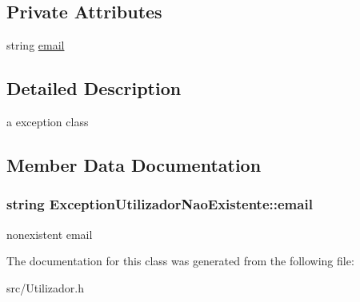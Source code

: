 \subsection*{Private Attributes}
\begin{DoxyCompactItemize}
\item 
string \hyperlink{class_exception_utilizador_nao_existente_a4e29231dbb3f22d7eff5abe95de52927}{email}
\end{DoxyCompactItemize}


\subsection{Detailed Description}
a exception class 

\subsection{Member Data Documentation}
\hypertarget{class_exception_utilizador_nao_existente_a4e29231dbb3f22d7eff5abe95de52927}{}
\subsubsection[{email}]{\setlength{\rightskip}{0pt plus 5cm}string Exception\+Utilizador\+Nao\+Existente\+::email\hspace{0.3cm}{\ttfamily [private]}}\label{class_exception_utilizador_nao_existente_a4e29231dbb3f22d7eff5abe95de52927}
nonexistent email 

The documentation for this class was generated from the following file\+:\begin{DoxyCompactItemize}
\item 
src/Utilizador.\+h\end{DoxyCompactItemize}
